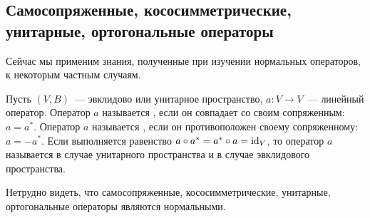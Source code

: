 \subsection{Самосопряженные, кососимметрические, унитарные,
  ортогональные операторы}


Сейчас мы применим знания, полученные при изучении нормальных
операторов, к некоторым частным случаям.

\begin{definition}
Пусть $(V,B)$~--- эвклидово или унитарное пространство,
$a\colon V\to V$~--- линейный оператор.
Оператор $a$ называется
, если он
совпадает со своим сопряженным: $a = a^*$. Оператор $a$ называется
, если он
противоположен своему сопряженному:
$a = -a^*$. Если выполняется равенство $a\circ a^* = a^*\circ a =
\operatorname{id}_V$, то оператор $a$ называется
 в случае унитарного
пространства и  в
случае эвклидового пространства.
\end{definition}

\begin{remark}
Нетрудно видеть, что самосопряженные, кососимметрические, унитарные,
ортогональные операторы являются нормальными.
\end{remark}


